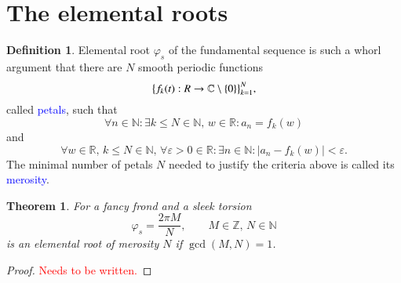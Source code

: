 \documentclass{article}
\newcommand{\red}[1]{\textcolor{red}{#1}}
\newcommand{\blue}[1]{\textcolor{blue}{#1}}
\theoremstyle{plain}
\newtheorem{theorem}{Theorem}[section]
\theoremstyle{definition}
\newtheorem{definition}{Definition}[section]
\newcommand{\cmz}{\mathbb C \setminus \{0\} }
\begin{document}
\section{The elemental roots}
\begin{definition}
Elemental root $\varphi_s$ of the fundamental sequence is such a whorl argument that there are $N$ smooth periodic functions 
$$ \big\{f_k(t): \mathbb \mathbb R \rightarrow \cmz\big\}_{k=1}^N 
,$$ called \blue{petals}, such that $$
\forall n \in \mathbb N: \exists k\le N \in \mathbb N,\,w \in \mathbb R: a_n = f_k(w) 
$$ and $$
\forall w \in \mathbb R,\,k\le N \in \mathbb N,\, \forall \varepsilon >0  \in \mathbb R : \exists n \in \mathbb N: |a_n - f_k(w)|<\varepsilon
.$$
The minimal number of petals $N$ needed to justify the criteria above is called its \blue{merosity}.  	
\end{definition}

\begin{theorem}
For a fancy frond and a sleek torsion $$\varphi_s = \frac{2\pi M}N, \qquad M \in \mathbb Z,\, N \in\mathbb N $$ is an elemental root of merosity $N$ if $\gcd(M,N)=1$.
\end{theorem}
\begin{proof}
\red{Needs to be written.}
\end{proof}
\end{document}
